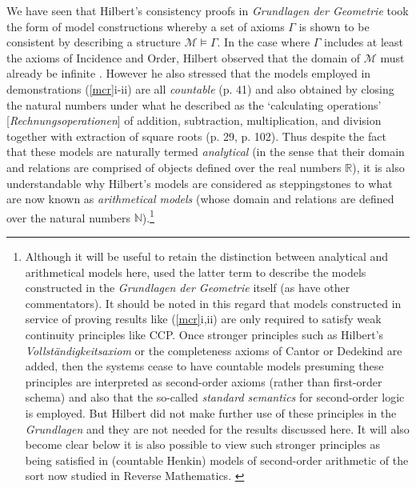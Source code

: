 \documentclass[11pt,fleqn,leqno]{article}
\begin{document}
We have seen that Hilbert's consistency proofs in  \textsl{Grundlagen der Geometrie} took the form of model constructions whereby a set of axioms $\Gamma$ is shown to be consistent by describing a structure $\mathcal{M} \models \Gamma$.  In the case where $\Gamma$ includes at least the axioms of Incidence and Order, Hilbert observed that the domain of $\mathcal{M}$ must already be infinite \citeyearpar[p. 8]{Hilbert1971}.   However he also stressed that the models employed in demonstrations (\ref{mcr}i-ii) are all \textsl{countable}  (p. 41) and also obtained by closing the natural numbers under what he described as the `calculating operations' [\textsl{Rechnungsoperationen}] of addition, subtraction, multiplication, and division together with extraction of square roots (p. 29, p. 102).   Thus despite the fact that these models are naturally termed \textsl{analytical} (in the sense that their domain and relations are comprised of objects defined over the real numbers $\mathbb{R}$), it is also understandable why Hilbert's models are considered as  steppingstones to what are now known as \textsl{arithmetical models} (whose domain and relations are defined over the natural numbers $\mathbb{N}$).\footnote{Although it will be useful to retain the distinction between analytical and arithmetical models here, \citet{Bernays1967} used the latter term to describe the models constructed in the \textsl{Grundlagen der Geometrie} itself (as have other commentators).   It should be noted in this regard that models constructed in service of proving results like (\ref{mcr}i,ii) are only required to satisfy weak continuity principles like CCP.   Once stronger principles such as Hilbert's \textsl{Vollst\"andigkeitsaxiom} or the completeness axioms of Cantor or Dedekind are added, then the systems cease to have countable models presuming these principles are interpreted as second-order axioms (rather than first-order schema) and also that the so-called \textsl{standard semantics} for second-order logic is employed.   But Hilbert did not make further use of these principles in the \textsl{Grundlagen} and they are not needed for the results discussed here.    It will also become clear below it is also possible to view such stronger principles as being satisfied in (countable Henkin) models of second-order arithmetic of the sort now studied in Reverse Mathematics. \label{nsol}}
\end{document}
